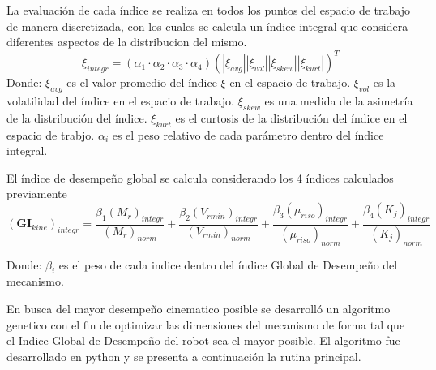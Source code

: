 La evaluación de cada índice se realiza en todos los puntos del espacio de trabajo de manera discretizada, con los cuales se calcula un índice integral que considera diferentes aspectos de la distribucion del mismo.
\begin{equation}
    \xi_{integr} = (\alpha_1 \cdot\alpha_2\cdot \alpha_3 \cdot\alpha_4)(|\xi_{avg}| |\xi_{vol}| |\xi_{skew}| |\xi_{kurt}| )^T
\end{equation}
Donde:\newline
$\xi_{avg}$ es el valor promedio del índice $\xi$ en el espacio de trabajo. \newline
$\xi_{vol}$ es la volatilidad del índice en el espacio de trabajo. \newline
$\xi_{skew}$ es una medida de la asimetría de la distribución del índice. \newline
$\xi_{kurt}$ es el curtosis de la distribución del índice en el espacio de trabjo. \newline
$\alpha_i$ es el peso relativo de cada parámetro dentro del índice integral. \newline

El índice de desempeño global se calcula considerando los 4 índices calculados previamente
\begin{equation}
    \left(\textbf{GI}_{kine}\right)_{integr} = 
    \frac{\beta_1(M_r)_{integr}}{(M_r)_{norm}} +
    \frac{\beta_2(V_{rmin})_{integr}}{(V_{rmin})_{norm}} +
    \frac{\beta_3(\mu_{riso})_{integr}}{(\mu_{riso})_{norm}} +
    \frac{\beta_4(K_j)_{integr}}{(K_j)_{norm}} 
\end{equation}

Donde:\newline
$\beta_{i}$ es el peso de cada indice dentro del índice Global de Desempeño del mecanismo.\newline

En busca del mayor desempeño cinematico posible se desarrolló un algoritmo genetico con el fin de optimizar las dimensiones del mecanismo de forma tal que el Indice Global de Desempeño del robot sea el mayor posible. El algoritmo fue desarrollado en python y se presenta a continuación la rutina principal.

